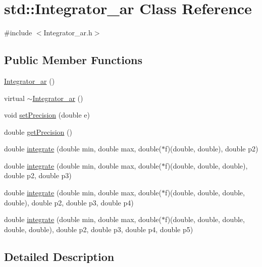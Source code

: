 \hypertarget{classstd_1_1_integrator__ar}{\section{std\-:\-:Integrator\-\_\-ar Class Reference}
\label{classstd_1_1_integrator__ar}
}


{\ttfamily \#include $<$Integrator\-\_\-ar.\-h$>$}

\subsection*{Public Member Functions}
\begin{DoxyCompactItemize}
\item 
\hyperlink{classstd_1_1_integrator__ar_af6891707789045125808e5fabeebd8af}{Integrator\-\_\-ar} ()
\item 
virtual \hyperlink{classstd_1_1_integrator__ar_aa0dbdce6046ef2140987ea38ef82b608}{$\sim$\-Integrator\-\_\-ar} ()
\item 
void \hyperlink{classstd_1_1_integrator__ar_afdedf1a409b53eafad3787c7667f2841}{set\-Precision} (double e)
\item 
double \hyperlink{classstd_1_1_integrator__ar_ad8d6b4d05cfba786880e3b27712ec2a8}{get\-Precision} ()
\item 
double \hyperlink{classstd_1_1_integrator__ar_a15a31fdc79268a68d7c20b102ec0a1b7}{integrate} (double min, double max, double($\ast$f)(double, double), double p2)
\item 
double \hyperlink{classstd_1_1_integrator__ar_a41835a163fcff3adf976513e8b7556ad}{integrate} (double min, double max, double($\ast$f)(double, double, double), double p2, double p3)
\item 
double \hyperlink{classstd_1_1_integrator__ar_a3bf73e53196c3954e20ac1f0c58fefb1}{integrate} (double min, double max, double($\ast$f)(double, double, double, double), double p2, double p3, double p4)
\item 
double \hyperlink{classstd_1_1_integrator__ar_a4920fc4135d380373abee16a073919fa}{integrate} (double min, double max, double($\ast$f)(double, double, double, double, double), double p2, double p3, double p4, double p5)
\end{DoxyCompactItemize}


\subsection{Detailed Description}


